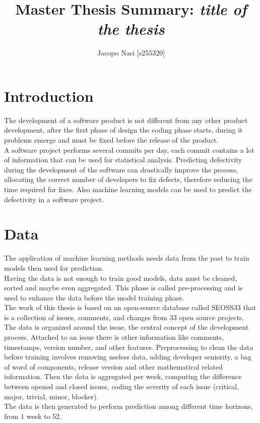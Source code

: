 \documentclass{article}
\begin{document}
\title{Master Thesis Summary: \textit{title of the thesis}}

\author{Jacopo Nasi [s255320]}

\maketitle

\section{Introduction}
The development of a software product is not different from any other product development, after the first phase of design the coding phase starts, during it problems emerge and must be fixed before the release of the product.\\
A software project performs several commits per day, each commit contains a lot of information that can be used for statistical analysis. Predicting defectivity during the development of the software can drastically improve the process, allocating the correct number of developers to fix defects, therefore reducing the time required for fixes. Also machine learning models can be used to predict the defectivity in a software project.

\section{Data}
The application of machine learning methods needs data from the past to train models then used for prediction.\\
Having the data is not enough to train good models, data must be cleaned, sorted and maybe even aggregated. This phase is called pre-processing and is used to enhance the data before the model training phase.\\
The work of this thesis is based on an open-source database called SEOSS33 that is a collection of issues, comments, and changes from  33 open source projects. The data is organized around the issue, the central concept of the development process. Attached to an issue there is other information like comments, timestamps, version number, and other features. 
Preprocessing to clean the data before training involves removing useless data, adding developer seniority, a bag of word of components, release version and other mathematical related information. Then the data is aggregated per week, computing the difference between opened and closed issues, coding the severity of each issue (critical, major, trivial, minor, blocker).\\
The data is then generated to perform prediction among different time horizons, from 1 week to 52.
\end{document}
